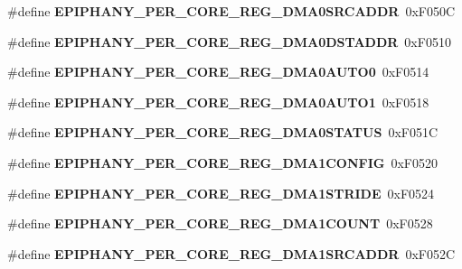\begin{DoxyCompactItemize}
\#define {\bfseries E\+P\+I\+P\+H\+A\+N\+Y\+\_\+\+P\+E\+R\+\_\+\+C\+O\+R\+E\+\_\+\+R\+E\+G\+\_\+\+D\+M\+A0\+S\+R\+C\+A\+D\+DR}~0x\+F050C
\item 
\mbox{\label{epiphany-utility_8h_a704eb9ca978ecdad2925ae53c472cbc8}} 
\#define {\bfseries E\+P\+I\+P\+H\+A\+N\+Y\+\_\+\+P\+E\+R\+\_\+\+C\+O\+R\+E\+\_\+\+R\+E\+G\+\_\+\+D\+M\+A0\+D\+S\+T\+A\+D\+DR}~0x\+F0510
\item 
\mbox{\label{epiphany-utility_8h_a6828fd277c6c7a95eaf1f01d57638dda}} 
\#define {\bfseries E\+P\+I\+P\+H\+A\+N\+Y\+\_\+\+P\+E\+R\+\_\+\+C\+O\+R\+E\+\_\+\+R\+E\+G\+\_\+\+D\+M\+A0\+A\+U\+T\+O0}~0x\+F0514
\item 
\mbox{\label{epiphany-utility_8h_ac6a8ab233850aa8b7501fd8ce4f871e2}} 
\#define {\bfseries E\+P\+I\+P\+H\+A\+N\+Y\+\_\+\+P\+E\+R\+\_\+\+C\+O\+R\+E\+\_\+\+R\+E\+G\+\_\+\+D\+M\+A0\+A\+U\+T\+O1}~0x\+F0518
\item 
\mbox{\label{epiphany-utility_8h_a94d336cc902a3d7dbd2dcf9bdaa0dab6}} 
\#define {\bfseries E\+P\+I\+P\+H\+A\+N\+Y\+\_\+\+P\+E\+R\+\_\+\+C\+O\+R\+E\+\_\+\+R\+E\+G\+\_\+\+D\+M\+A0\+S\+T\+A\+T\+US}~0x\+F051C
\item 
\mbox{\label{epiphany-utility_8h_aa792d6898564d567d5fdc17fabd22bb2}} 
\#define {\bfseries E\+P\+I\+P\+H\+A\+N\+Y\+\_\+\+P\+E\+R\+\_\+\+C\+O\+R\+E\+\_\+\+R\+E\+G\+\_\+\+D\+M\+A1\+C\+O\+N\+F\+IG}~0x\+F0520
\item 
\mbox{\label{epiphany-utility_8h_a7d5e41340d69e2d07d70e84b5b02bdb9}} 
\#define {\bfseries E\+P\+I\+P\+H\+A\+N\+Y\+\_\+\+P\+E\+R\+\_\+\+C\+O\+R\+E\+\_\+\+R\+E\+G\+\_\+\+D\+M\+A1\+S\+T\+R\+I\+DE}~0x\+F0524
\item 
\mbox{\label{epiphany-utility_8h_acb8b0349cc798a3593bfab290193045d}} 
\#define {\bfseries E\+P\+I\+P\+H\+A\+N\+Y\+\_\+\+P\+E\+R\+\_\+\+C\+O\+R\+E\+\_\+\+R\+E\+G\+\_\+\+D\+M\+A1\+C\+O\+U\+NT}~0x\+F0528
\item 
\mbox{\label{epiphany-utility_8h_a3343be32659c0209c594351965f71e54}} 
\#define {\bfseries E\+P\+I\+P\+H\+A\+N\+Y\+\_\+\+P\+E\+R\+\_\+\+C\+O\+R\+E\+\_\+\+R\+E\+G\+\_\+\+D\+M\+A1\+S\+R\+C\+A\+D\+DR}~0x\+F052C

\end{DoxyCompactItemize}
